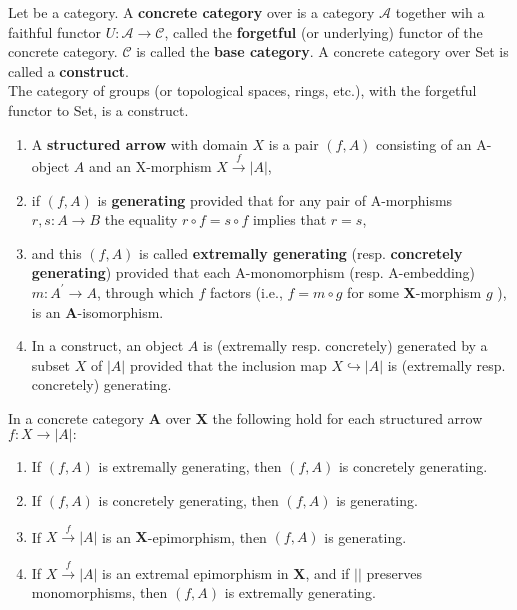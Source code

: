 Let \cc be a category. A \textbf{concrete category} over \cc is a category $\mathcal{A}$ together wih a faithful functor $U: \mathcal{A} \rightarrow \mathcal{C}$, called the \textbf{forgetful} (or underlying) functor of the concrete category. $\mathcal{C}$ is called the \textbf{base category}. A concrete category over Set is called a \textbf{construct}.\\
The category of groups (or topological spaces, rings, etc.), with the forgetful functor to Set, is a construct.\\

\begin{enumerate}
    \item A \textbf{structured arrow} with domain $X$ is a pair $(f, A)$ consisting of an A-object $A$ and an X-morphism $X \xrightarrow{f}|A|$,
    \item if $(f, A)$ is \textbf{generating} provided that for any pair of A-morphisms $r, s: A \rightarrow B$ the equality $r \circ f=s \circ f$ implies that $r=s$,
    \item and this $(f, A)$ is called \textbf{extremally generating} (resp. \textbf{concretely generating}) provided that each A-monomorphism (resp. A-embedding) $m: A^{\prime} \rightarrow A$, through which $f$ factors (i.e., $f=m \circ g$ for some $\mathbf{X}$-morphism $g$ ), is an $\mathbf{A}$-isomorphism.
    \item In a construct, an object $A$ is (extremally resp. concretely) generated by a subset $X$ of $|A|$ provided that the inclusion map $X \hookrightarrow|A|$ is (extremally resp. concretely) generating.
\end{enumerate}

\begin{prop}
    In a concrete category $\mathbf{A}$ over $\mathbf{X}$ the following hold for each structured arrow $f: X \rightarrow|A|:$
    \begin{enumerate}
        \item If $(f, A)$ is extremally generating, then $(f, A)$ is concretely generating.
        \item If $(f, A)$ is concretely generating, then $(f, A)$ is generating.
        \item If $X \xrightarrow{f}|A|$ is an $\mathbf{X}$-epimorphism, then $(f, A)$ is generating.
        \item If $X \xrightarrow{f}|A|$ is an extremal epimorphism in $\mathbf{X}$, and if $||$ preserves monomorphisms, then $(f, A)$ is extremally generating.
    \end{enumerate}
\end{prop}

